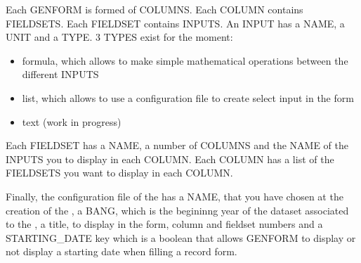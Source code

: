 Each GENFORM is formed of COLUMNS. Each COLUMN contains FIELDSETS. Each FIELDSET contains INPUTS. An INPUT has a NAME, a UNIT and a TYPE. 3 TYPES exist for the moment:

\begin{itemize}
	\item formula, which allows to make simple mathematical operations between the different INPUTS
	\item list, which allows to use a configuration file to create select input in the form
	\item text (work in progress)
\end{itemize}

Each FIELDSET has a NAME, a number of COLUMNS and the NAME of the INPUTS you to display in each COLUMN. Each COLUMN has a list of the FIELDSETS you want to display in each COLUMN.

Finally, the configuration file of the  has a NAME, that you have chosen at the creation of the , a BANG, which is the begininng year of the dataset associated to the , a title, to display in the  form, column and fieldset numbers and a STARTING\_DATE key which is a boolean that allows GENFORM to display or not display a starting date when filling a record form.

